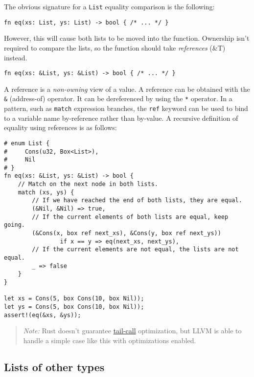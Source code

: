 \documentclass[]{article}
\begin{document}
The obvious signature for a \texttt{List} equality comparison is the
following:

\begin{verbatim}
fn eq(xs: List, ys: List) -> bool { /* ... */ }
\end{verbatim}

However, this will cause both lists to be moved into the function.
Ownership isn't required to compare the lists, so the function should
take \emph{references} (\&T) instead.

\begin{verbatim}
fn eq(xs: &List, ys: &List) -> bool { /* ... */ }
\end{verbatim}

A reference is a \emph{non-owning} view of a value. A reference can be
obtained with the \texttt{\&} (address-of) operator. It can be
dereferenced by using the \texttt{*} operator. In a pattern, such as
\texttt{match} expression branches, the \texttt{ref} keyword can be used
to bind to a variable name by-reference rather than by-value. A
recursive definition of equality using references is as follows:

\begin{verbatim}
# enum List {
#     Cons(u32, Box<List>),
#     Nil
# }
fn eq(xs: &List, ys: &List) -> bool {
    // Match on the next node in both lists.
    match (xs, ys) {
        // If we have reached the end of both lists, they are equal.
        (&Nil, &Nil) => true,
        // If the current elements of both lists are equal, keep going.
        (&Cons(x, box ref next_xs), &Cons(y, box ref next_ys))
                if x == y => eq(next_xs, next_ys),
        // If the current elements are not equal, the lists are not equal.
        _ => false
    }
}

let xs = Cons(5, box Cons(10, box Nil));
let ys = Cons(5, box Cons(10, box Nil));
assert!(eq(&xs, &ys));
\end{verbatim}

\begin{quote}
\emph{Note:} Rust doesn't guarantee
\href{http://en.wikipedia.org/wiki/Tail_call}{tail-call} optimization,
but LLVM is able to handle a simple case like this with optimizations
enabled.
\end{quote}

\subsection{Lists of other types}\label{lists-of-other-types}
\end{document}
